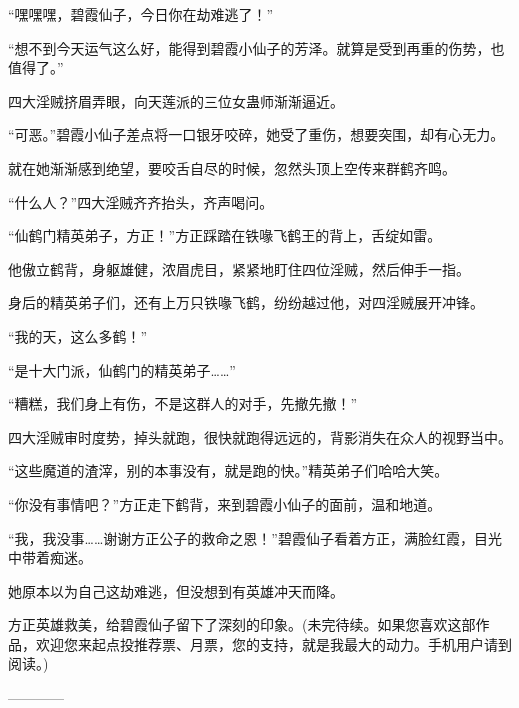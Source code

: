 \begin{this_body}
“嘿嘿嘿，碧霞仙子，今日你在劫难逃了！”

“想不到今天运气这么好，能得到碧霞小仙子的芳泽。就算是受到再重的伤势，也值得了。”

四大淫贼挤眉弄眼，向天莲派的三位女蛊师渐渐逼近。

“可恶。”碧霞小仙子差点将一口银牙咬碎，她受了重伤，想要突围，却有心无力。

就在她渐渐感到绝望，要咬舌自尽的时候，忽然头顶上空传来群鹤齐鸣。

“什么人？”四大淫贼齐齐抬头，齐声喝问。

“仙鹤门精英弟子，方正！”方正踩踏在铁喙飞鹤王的背上，舌绽如雷。

他傲立鹤背，身躯雄健，浓眉虎目，紧紧地盯住四位淫贼，然后伸手一指。

身后的精英弟子们，还有上万只铁喙飞鹤，纷纷越过他，对四淫贼展开冲锋。

“我的天，这么多鹤！”

“是十大门派，仙鹤门的精英弟子……”

“糟糕，我们身上有伤，不是这群人的对手，先撤先撤！”

四大淫贼审时度势，掉头就跑，很快就跑得远远的，背影消失在众人的视野当中。

“这些魔道的渣滓，别的本事没有，就是跑的快。”精英弟子们哈哈大笑。

“你没有事情吧？”方正走下鹤背，来到碧霞小仙子的面前，温和地道。

“我，我没事……谢谢方正公子的救命之恩！”碧霞仙子看着方正，满脸红霞，目光中带着痴迷。

她原本以为自己这劫难逃，但没想到有英雄冲天而降。

方正英雄救美，给碧霞仙子留下了深刻的印象。(未完待续。如果您喜欢这部作品，欢迎您来起点投推荐票、月票，您的支持，就是我最大的动力。手机用户请到阅读。)

------------

\end{this_body}

